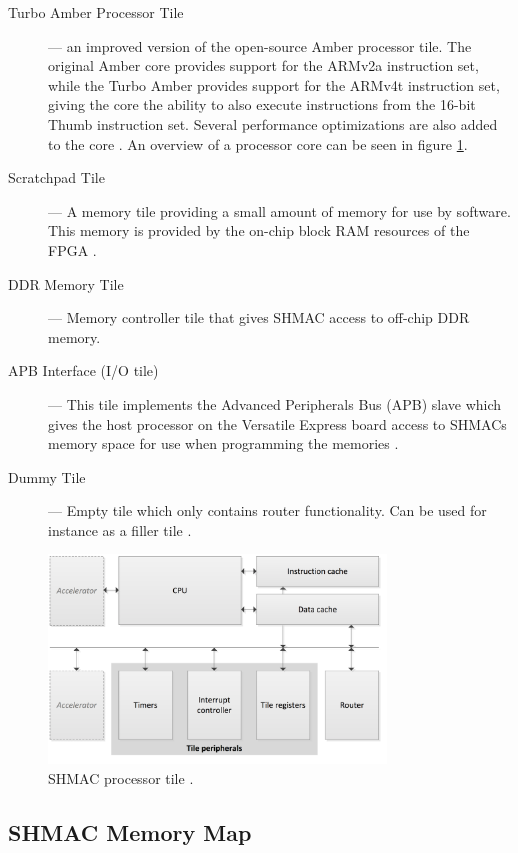 \begin{description}
  \item[Turbo Amber Processor Tile] --- an improved version of the open-source Amber processor tile.
  	The original Amber core provides support for the ARMv2a instruction set, while the Turbo Amber
	provides support for the ARMv4t instruction set, giving the core the ability to also execute
	instructions from the 16-bit Thumb instruction set. Several performance optimizations are
	also added to the core \cite{turboamber}. An overview of a processor core can be seen in
	figure \ref{fig:shmac-cpu}.
  \item[Scratchpad Tile] --- A memory tile providing a small amount of memory for use by software.
  	This memory is provided by the on-chip block RAM resources of the FPGA \cite{shmac-plan}.
  \item[DDR Memory Tile] --- Memory controller tile that gives SHMAC access to off-chip DDR memory.
  \item[APB Interface (I/O tile)] --- This tile implements the Advanced Peripherals Bus (APB) slave
  	which gives the host processor on the Versatile Express board access to SHMACs memory space
	for use when programming the memories \cite{shmac-plan}.
  \item[Dummy Tile] --- Empty tile which only contains router functionality. Can be used for instance
  	as a filler tile \cite{shmac-plan}.
\end{description}


\begin{figure}[htb]
    \centering
    \includegraphics[width=0.8\textwidth]{Figures/Heterogeneous/SHMACCPU}
    \caption{SHMAC processor tile \cite{shmac-plan}.}
    \label{fig:shmac-cpu}
\end{figure}

\subsection{SHMAC Memory Map}

